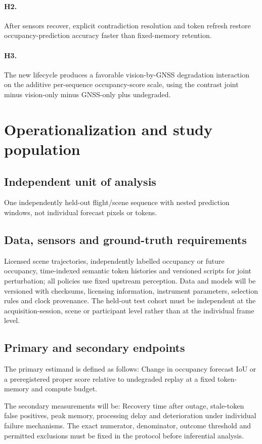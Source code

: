 \documentclass[11pt,a4paper]{article}
\begin{document}
\paragraph{H2.} After sensors recover, explicit contradiction resolution and token refresh restore occupancy-prediction accuracy faster than fixed-memory retention.

\paragraph{H3.} The new lifecycle produces a favorable vision-by-GNSS degradation interaction on the additive per-sequence occupancy-score scale, using the contrast joint minus vision-only minus GNSS-only plus undegraded.

\section{Operationalization and study population}
\subsection{Independent unit of analysis}
One independently held-out flight/scene sequence with nested prediction windows, not individual forecast pixels or tokens.

\subsection{Data, sensors and ground-truth requirements}
Licensed scene trajectories, independently labelled occupancy or future occupancy, time-indexed semantic token histories and versioned scripts for joint perturbation; all policies use fixed upstream perception. Data and models will be versioned with checksums, licensing information, instrument parameters, selection rules and clock provenance. The held-out test cohort must be independent at the acquisition-session, scene or participant level rather than at the individual frame level.

\subsection{Primary and secondary endpoints}
The primary estimand is defined as follows: Change in occupancy forecast IoU or a preregistered proper score relative to undegraded replay at a fixed token-memory and compute budget.

The secondary measurements will be: Recovery time after outage, stale-token false positives, peak memory, processing delay and deterioration under individual failure mechanisms. The exact numerator, denominator, outcome threshold and permitted exclusions must be fixed in the protocol before inferential analysis.
\end{document}
